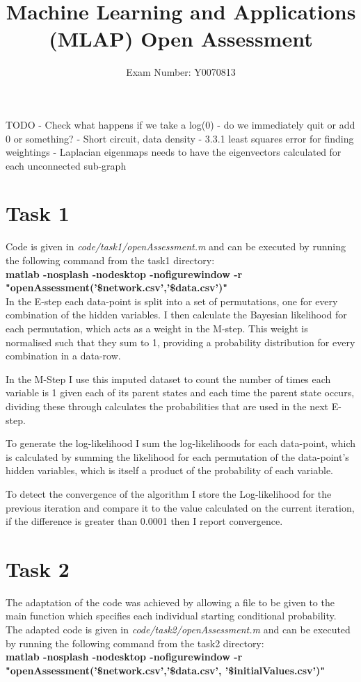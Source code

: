 \documentclass{article}
\begin{document}
\title{Machine Learning and Applications (MLAP) Open Assessment}
\author{Exam Number: Y0070813}
\date{\vspace{-5ex}}
\maketitle
TODO - Check what happens if we take a log(0) - do we immediately quit or add 0 or something?
- Short circuit, data density	
 - 3.3.1 least squares error for finding weightings
- Laplacian eigenmaps needs to have the eigenvectors calculated for each unconnected sub-graph
\section{Task 1}
Code is given in \textit{code/task1/openAssessment.m} and can be executed by running the following command from the task1 directory: \\
\textbf{matlab -nosplash -nodesktop -nofigurewindow -r "openAssessment('\$network.csv','\$data.csv')"}\\


In the E-step each data-point is split into a set of permutations, one for every combination of the hidden variables. I then calculate the Bayesian likelihood for each permutation, which acts as a weight in the M-step. This weight is normalised such that they sum to 1, providing a probability distribution for every combination in a data-row. 

In the M-Step I use this imputed dataset to count the number of times each variable is 1 given each of its parent states and each time the parent state occurs, dividing these through calculates the probabilities that are used in the next E-step. 

To generate the log-likelihood I sum the log-likelihoods for each data-point, which is calculated by summing the likelihood for each permutation of the data-point's hidden variables, which is itself a product of the probability of each variable.

To detect the convergence of the algorithm I store the Log-likelihood for the previous iteration and compare it to the value calculated on the current iteration, if the difference is greater than 0.0001 then I report convergence.
\section{Task 2}
The adaptation of the code was achieved by allowing a file to be given to the main function which specifies each individual starting conditional probability. The adapted code is given in \textit{code/task2/openAssessment.m} and can be executed by running the following command from the task2 directory:\\
\textbf{matlab -nosplash -nodesktop -nofigurewindow -r "openAssessment('\$network.csv','\$data.csv', '\$initialValues.csv')"} \\\\
\end{document}
